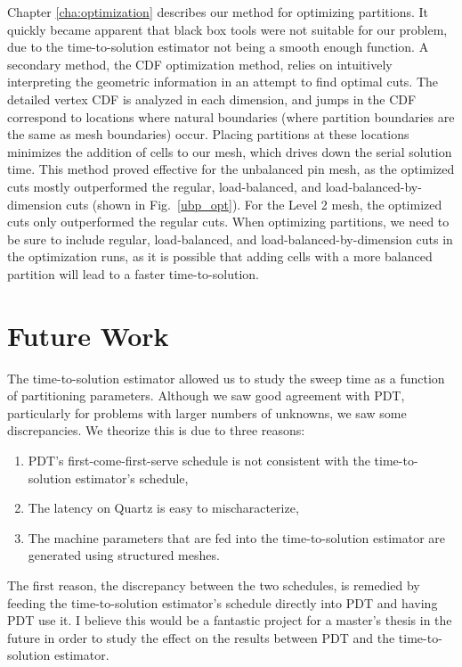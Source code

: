 Chapter \ref{cha:optimization} describes our method for optimizing partitions.
It quickly became apparent that black box tools were not suitable for our problem, due to the time-to-solution estimator not being a smooth enough function.
A secondary method, the CDF optimization method, relies on intuitively interpreting the geometric information in an attempt to find optimal cuts.
The detailed vertex CDF is analyzed in each dimension, and jumps in the CDF correspond to locations where natural boundaries (where partition boundaries are the same as mesh boundaries) occur.
Placing partitions at these locations minimizes the addition of cells to our mesh, which drives down the serial solution time.
This method proved effective for the unbalanced pin mesh, as the optimized cuts mostly outperformed the regular, load-balanced, and load-balanced-by-dimension cuts (shown in Fig.~\ref{ubp_opt}).
For the Level 2 mesh, the optimized cuts only outperformed the regular cuts.
When optimizing partitions, we need to be sure to include regular, load-balanced, and load-balanced-by-dimension cuts in the optimization runs, as it is possible that adding cells with a more balanced partition will lead to a faster time-to-solution.

\section{Future Work}

The time-to-solution estimator allowed us to study the sweep time as a function of partitioning parameters.
Although we saw good agreement with PDT, particularly for problems with larger numbers of unknowns, we saw some discrepancies.
We theorize this is due to three reasons:
\begin{enumerate}
\item PDT's first-come-first-serve schedule is not consistent with the time-to-solution estimator's schedule,
\item The latency on Quartz is easy to mischaracterize,
\item The machine parameters that are fed into the time-to-solution estimator are generated using structured meshes.
\end{enumerate}

The first reason, the discrepancy between the two schedules, is remedied by feeding the time-to-solution estimator's schedule directly into PDT and having PDT use it.
I believe this would be a fantastic project for a master's thesis in the future in order to study the effect on the results between PDT and the time-to-solution estimator.

